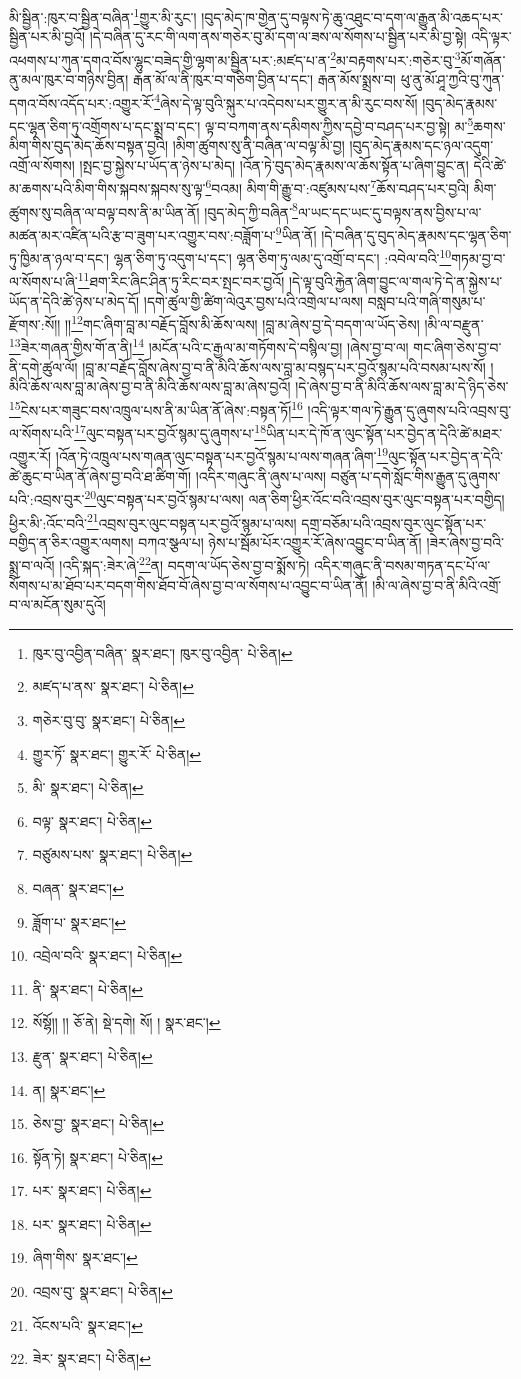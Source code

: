 མི་སྦྱིན་:ཁུར་བ་སྦྱིན་བཞིན་\footnote{ཁུར་བུ་འབྱིན་བཞིན་  སྣར་ཐང་། ཁུར་བུ་འབྱིན་  པེ་ཅིན། }གྱུར་མི་རུང་། །བུད་མེད་ཁ་གྱེན་དུ་བལྟས་ཏེ་ཆུ་འཐུང་བ་དག་ལ་རྒྱུན་མི་འཆད་པར་སྦྱིན་པར་མི་བྱའོ། །དེ་བཞིན་དུ་རང་གི་ལག་ནས་གཅེར་བུ་མོ་དག་ལ་ཟས་ལ་སོགས་པ་སྦྱིན་པར་མི་བྱ་སྟེ། འདི་ལྟར་འཕགས་པ་ཀུན་དགའ་བོས་ལྷུང་བཟེད་གྱི་ལྷག་མ་སྦྱིན་པར་:མཛད་པ་ན་\footnote{མཛད་པ་ནས་  སྣར་ཐང་།  པེ་ཅིན། }མ་བརྟགས་པར་:གཅེར་བུ་\footnote{གཅེར་བུ་བུ་  སྣར་ཐང་།  པེ་ཅིན། }མོ་གཞོན་ནུ་མལ་ཁུར་བ་གཉིས་བྱིན། རྒན་མོ་ལ་ནི་ཁུར་བ་གཅིག་བྱིན་པ་དང་། རྒན་མོས་སྨྲས་བ། ཕུ་ནུ་མོ་ཤཱ་ཀྱའི་བུ་ཀུན་དགའ་བོས་འདོད་པར་:འགྱུར་རོ་\footnote{གྱུར་ཏོ་  སྣར་ཐང་། གྱུར་རོ་  པེ་ཅིན། }ཞེས་དེ་ལྟ་བུའི་སྐུར་པ་འདེབས་པར་གྱུར་ན་མི་རུང་བས་སོ། །བུད་མེད་རྣམས་དང་ལྷན་ཅིག་ཏུ་འགྲོགས་པ་དང་སྨྲ་བ་དང་། ལྟ་བ་བཀག་ནས་དམིགས་ཀྱིས་དབྱེ་བ་བཤད་པར་བྱ་སྟེ། མ་\footnote{མི་  སྣར་ཐང་།  པེ་ཅིན། }ཆགས་མིག་གིས་བུད་མེད་ཆོས་བསྟན་བྱའི། །མིག་ཚུགས་སུ་ནི་བཞིན་ལ་བལྟ་མི་བྱ། །བུད་མེད་རྣམས་དང་ཉལ་འདུག་འགྲོ་ལ་སོགས། །སྤང་བྱ་སྐྱེས་པ་ཡོད་ན་ཉེས་པ་མེད། །འོན་ཏེ་བུད་མེད་རྣམས་ལ་ཆོས་སྟོན་པ་ཞིག་བྱུང་ན། དེའི་ཚེ་མ་ཆགས་པའི་མིག་གིས་སྐབས་སྐབས་སུ་ལྟ་\footnote{བལྟ་  སྣར་ཐང་།  པེ་ཅིན། }བའམ། མིག་གི་རྒྱུ་བ་:འཛུམས་པས་\footnote{བཙུམས་པས་  སྣར་ཐང་།  པེ་ཅིན། }ཆོས་བཤད་པར་བྱའི། མིག་ཚུགས་སུ་བཞིན་ལ་བལྟ་བས་ནི་མ་ཡིན་ནོ། །བུད་མེད་ཀྱི་བཞིན་\footnote{བཞན་  སྣར་ཐང་། }ལ་ཡང་དང་ཡང་དུ་བལྟས་ནས་བྱིས་པ་ལ་མཚན་མར་འཛིན་པའི་རྩ་བ་ཟུག་པར་འགྱུར་བས་:བཟློག་པ་\footnote{ཟློག་པ་  སྣར་ཐང་། }ཡིན་ནོ། །དེ་བཞིན་དུ་བུད་མེད་རྣམས་དང་ལྷན་ཅིག་ཏུ་ཁྱིམ་ན་ཉལ་བ་དང་། ལྷན་ཅིག་ཏུ་འདུག་པ་དང་། ལྷན་ཅིག་ཏུ་ལམ་དུ་འགྲོ་བ་དང་། :འབེལ་བའི་\footnote{འབྲེལ་བའི་  སྣར་ཐང་།  པེ་ཅིན། }གཏམ་བྱ་བ་ལ་སོགས་པ་ཞི་\footnote{ནི་  སྣར་ཐང་།  པེ་ཅིན། }ཐག་རིང་ཞིང་ཤིན་ཏུ་རིང་བར་སྤང་བར་བྱའོ། །དེ་ལྟ་བུའི་རྐྱེན་ཞིག་བྱུང་ལ་གལ་ཏེ་དེ་ན་སྐྱེས་པ་ཡོད་ན་དེའི་ཚེ་ཉེས་པ་མེད་དོ། །དགེ་ཚུལ་གྱི་ཚིག་ལེའུར་བྱས་པའི་འགྲེལ་པ་ལས། བསླབ་པའི་གཞི་གསུམ་པ་རྫོགས་:སོ།། །།\footnote{སོསྷོ།། །།  ཅོ་ནེ།  སྡེ་དགེ། སོ། །  སྣར་ཐང་། }གང་ཞིག་བླ་མ་བརྗོད་བློས་མི་ཆོས་ལས། །བླ་མ་ཞེས་བྱ་དེ་བདག་ལ་ཡོད་ཅེས། །མི་ལ་བརྫུན་\footnote{རྫུན་  སྣར་ཐང་།  པེ་ཅིན། }ཟེར་གཞན་གྱིས་གོ་ན་ནི།\footnote{ན།  སྣར་ཐང་། } །མངོན་པའི་ང་རྒྱལ་མ་གཏོགས་དེ་བསྙིལ་བྱ། །ཞེས་བྱ་བ་ལ། གང་ཞིག་ཅེས་བྱ་བ་ནི་དགེ་ཚུལ་ལོ། །བླ་མ་བརྗོད་བློས་ཞེས་བྱ་བ་ནི་མིའི་ཆོས་ལས་བླ་མ་བསྙད་པར་བྱའོ་སྙམ་པའི་བསམ་པས་སོ། །མིའི་ཆོས་ལས་བླ་མ་ཞེས་བྱ་བ་ནི་མིའི་ཆོས་ལས་བླ་མ་ཞེས་བྱའོ། །དེ་ཞེས་བྱ་བ་ནི་མིའི་ཆོས་ལས་བླ་མ་དེ་ཉིད་ཅེས་\footnote{ཅེས་བྱ་  སྣར་ཐང་།  པེ་ཅིན། }ངེས་པར་གཟུང་བས་འཁྲུལ་པས་ནི་མ་ཡིན་ནོ་ཞེས་:བསྟན་ཏོ།\footnote{སྟོན་ཏེ།  སྣར་ཐང་།  པེ་ཅིན། } །འདི་ལྟར་གལ་ཏེ་རྒྱུན་དུ་ཞུགས་པའི་འབྲས་བུ་ལ་སོགས་པའི་\footnote{པར་  སྣར་ཐང་།  པེ་ཅིན། }ལུང་བསྟན་པར་བྱའོ་སྙམ་དུ་ཞུགས་པ་\footnote{པར་  སྣར་ཐང་།  པེ་ཅིན། }ཡིན་པར་དེ་ཁོ་ན་ལུང་སྟོན་པར་བྱེད་ན་དེའི་ཚེ་མཐར་འགྱུར་རོ། །འོན་ཏེ་འཁྲུལ་པས་གཞན་ལུང་བསྟན་པར་བྱའོ་སྙམ་པ་ལས་གཞན་ཞིག་\footnote{ཞིག་གིས་  སྣར་ཐང་། }ལུང་སྟོན་པར་བྱེད་ན་དེའི་ཚེ་ཆུང་བ་ཡིན་ནོ་ཞེས་བྱ་བའི་ཐ་ཚིག་གོ། །འདིར་གཞུང་ནི་ཞུས་པ་ལས། བཙུན་པ་དགེ་སློང་གིས་རྒྱུན་དུ་ཞུགས་པའི་:འབྲས་བུར་\footnote{འབྲས་བུ་  སྣར་ཐང་།  པེ་ཅིན། }ལུང་བསྟན་པར་བྱའོ་སྙམ་པ་ལས། ལན་ཅིག་ཕྱིར་འོང་བའི་འབྲས་བུར་ལུང་བསྟན་པར་བགྱིད། ཕྱིར་མི་:འོང་བའི་\footnote{འོངས་པའི་  སྣར་ཐང་། }འབྲས་བུར་ལུང་བསྟན་པར་བྱའོ་སྙམ་པ་ལས། དགྲ་བཅོམ་པའི་འབྲས་བུར་ལུང་སྟོན་པར་བགྱིད་ན་ཅིར་འགྱུར་ལགས། བཀའ་སྩལ་པ། ཉེས་པ་སྦོམ་པོར་འགྱུར་རོ་ཞེས་འབྱུང་བ་ཡིན་ནོ། །ཟེར་ཞེས་བྱ་བའི་སྨྲ་བ་ལའོ། །འདི་སྐད་:ཟེར་ཞེ་\footnote{ཟེར་  སྣར་ཐང་།  པེ་ཅིན། }ན། བདག་ལ་ཡོད་ཅེས་བྱ་བ་སྨོས་ཏེ། འདིར་གཞུང་ནི་བསམ་གཏན་དང་པོ་ལ་སོགས་པ་མ་ཐོབ་པར་བདག་གིས་ཐོབ་བོ་ཞེས་བྱ་བ་ལ་སོགས་པ་འབྱུང་བ་ཡིན་ནོ། །མི་ལ་ཞེས་བྱ་བ་ནི་མིའི་འགྲོ་བ་ལ་མངོན་སུམ་དུའོ། 